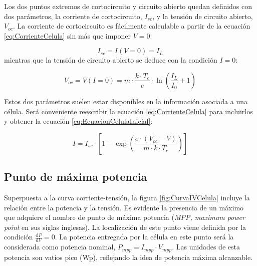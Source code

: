 Los dos puntos extremos de cortocircuito y circuito abierto quedan
definidos con dos parámetros, la corriente de cortocircuito, $I_{sc}$,
y la tensión de circuito abierto, $V_{oc}$.
La corriente de cortocircuito es fácilmente calculable a partir de
la ecuación \ref{eq:CorrienteCelula} sin más que imponer $V=0$:

\begin{equation}
I_{sc}=I(V=0)=I_{L}\label{eq:Isc}\end{equation}
mientras que la tensión de circuito abierto se deduce con la condición
$I=0$:

\begin{equation}
V_{oc}=V(I=0)=m\cdot\frac{k\cdot T_{c}}{e}\cdot\ln\left(\frac{I_{L}}{I_{0}}+1\right)\label{eq:Voc}\end{equation}


Estos dos parámetros suelen estar disponibles en la información asociada
a una célula. Será conveniente reescribir la ecuación \ref{eq:CorrienteCelula}
para incluirlos y obtener la ecuación \ref{eq:EcuacionCelulaInicial}:

\begin{equation}
I=I_{sc}\cdot\left[1-\exp\left(\frac{e\cdot(V_{oc}-V)}{m\cdot k\cdot T_{c}}\right)\right]\label{eq:EcuacionCelulaInicial}\end{equation}



\subsection{Punto de máxima potencia}

Superpuesta a la curva corriente-tensión, la figura \ref{fig:CurvaIVCelula}
incluye la relación entre la potencia y la tensión. Es evidente la
presencia de un máximo que adquiere el nombre de punto de máxima potencia
(\emph{MPP, maximum power point }en sus siglas inglesas). La localización
de este punto viene definida por la condición $\frac{\mathrm{d}P}{\mathrm{d}V}=0$.
La potencia entregada por la célula en este punto será la considerada
como potencia nominal, $P_{mpp}=I_{mpp}\cdot V_{mpp}$.
Las unidades de esta potencia son vatios pico (Wp), reflejando la
idea de potencia máxima alcanzable.

